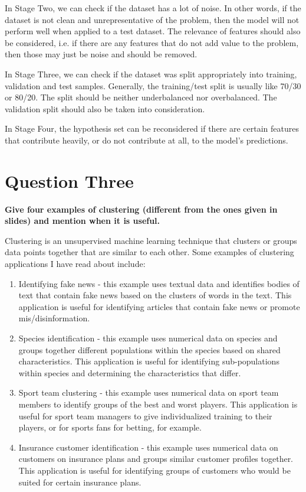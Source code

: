 \documentclass{article}
\begin{document}
In Stage Two, we can check if the dataset has a lot of noise. In other words, if the dataset is not clean and unrepresentative of the problem, then the model will not perform well when applied to a test dataset. The relevance of features should also be considered, i.e. if there are any features that do not add value to the problem, then those may just be noise and should be removed.

In Stage Three, we can check if the dataset was split appropriately into training, validation and test samples. Generally, the training/test split is usually like 70/30 or 80/20. The split should be neither underbalanced nor overbalanced. The validation split should also be taken into consideration.

In Stage Four, the hypothesis set can be reconsidered if there are certain features that contribute heavily, or do not contribute at all, to the model's predictions. 


\section{Question Three}
\noindent \textbf{Give four examples of clustering (different from the ones given in slides) and mention when it is useful.}

Clustering is an unsupervised machine learning technique that clusters or groups data points together that are similar to each other. Some examples of clustering applications I have read about include:

\begin{enumerate}
    \item Identifying fake news - this example uses textual data and identifies bodies of text that contain fake news based on the clusters of words in the text. This application is useful for identifying articles that contain fake news or promote mis/disinformation.
    \item Species identification - this example uses numerical data on species and groups together different populations within the species based on shared characteristics. This application is useful for identifying sub-populations within species and determining the characteristics that differ.
    \item Sport team clustering - this example uses numerical data on sport team members to identify groups of the best and worst players. This application is useful for sport team managers to give individualized training to their players, or for sports fans for betting, for example.
    \item Insurance customer identification - this example uses numerical data on customers on insurance plans and groups similar customer profiles together. This application is useful for identifying groups of customers who would be suited for certain insurance plans.
\end{enumerate}
\end{document}
